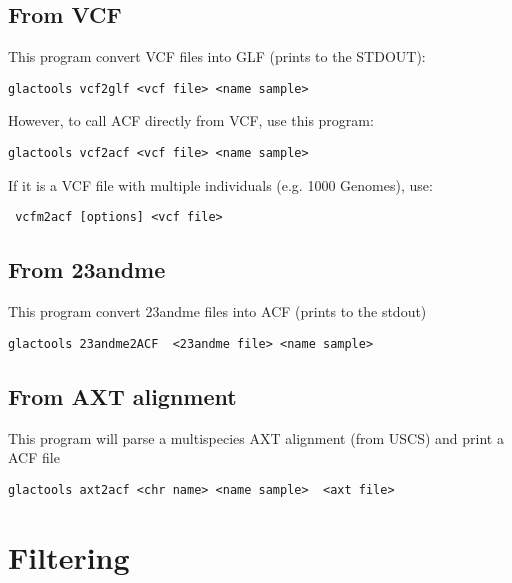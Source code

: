 \documentclass[a4paper]{article}
\begin{document}
\subsection{From VCF}

\noindent This program convert VCF files into GLF (prints to the STDOUT):

\begin{lstlisting}
glactools vcf2glf <vcf file> <name sample> 
\end{lstlisting}

However, to call ACF directly from VCF, use this program:

\begin{lstlisting}
glactools vcf2acf <vcf file> <name sample> 
\end{lstlisting}

If it is a VCF file with multiple individuals (e.g. 1000 Genomes), use:
\begin{lstlisting}
 vcfm2acf [options] <vcf file>
\end{lstlisting}

\subsection{From 23andme}

\noindent This program convert 23andme files into ACF (prints to the stdout)

\begin{lstlisting}
glactools 23andme2ACF  <23andme file> <name sample>
\end{lstlisting}

\subsection{From AXT alignment}

\noindent This program will parse a multispecies AXT alignment (from USCS) and print a ACF file

\begin{lstlisting}
glactools axt2acf <chr name> <name sample>  <axt file>
\end{lstlisting}


\section{Filtering}


\end{document}
